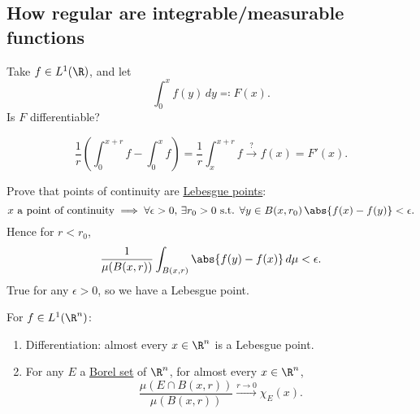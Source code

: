 \documentclass[twoside]{article}
\begin{document}
\subsection{How regular are integrable/measurable functions}
Take $f \in L^1(\R)$, and let
\begin{equation*}
    \int_0^x f(y) \, dy \eqqcolon F(x).
\end{equation*}
Is $F$ differentiable?
\begin{remark}
    \begin{equation*}
        \frac{1}{r} \left(\int_0^{x+r} f - \int_0^x f\right) = \frac{1}{r} \int_x^{x+r} f \xrightarrow{?} f(x) = F'(x).
    \end{equation*}
\end{remark}
\begin{ex}
    Prove that points of continuity are \hyperlink{def:lebPoint}{Lebesgue points}:
    \begin{equation*}
        x \text{ a point of continuity} \implies \forall \epsilon > 0, \, \exists r_0 > 0 \text{ s.t. } \forall y \in B(x, r_0) \, \abs{f(x) - f(y)} < \epsilon.
    \end{equation*}
    Hence for $r < r_0$,
    \begin{equation*}
        \frac{1}{\mu(B(x, r))} \int_{B(x,r)} \abs{f(y) - f(x)} \, d\mu < \epsilon.
    \end{equation*}
    True for any $\epsilon>0$, so we have a Lebesgue point.
\end{ex}
\begin{thm}
    For $f \in L^1(\R^n)$:
    \begin{enumerate}[label=(\arabic*)]
        \item Differentiation: almost every $x \in \R^n$ is a Lebesgue point.
        \item For any $E$ a \hyperlink{def:borelSet}{Borel set} of $\R^n$, for almost every $x \in \R^n$,
            \begin{equation*}
                \frac{\mu(E \cap B(x, r))}{\mu(B(x, r))} \xrightarrow{r \to 0} \chi_E(x).
            \end{equation*}
    \end{enumerate}
\end{thm}
\end{document}

